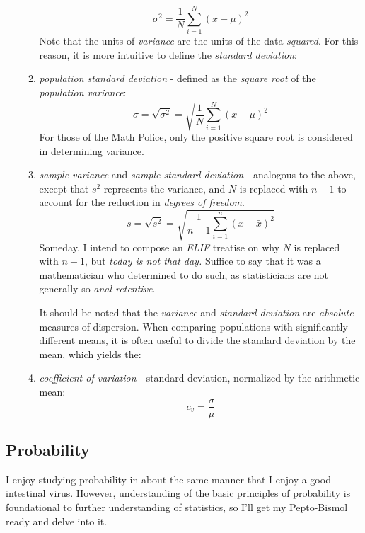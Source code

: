 \documentclass[12pt]{article}
\begin{document}
\begin{enumerate}
\begin{enumerate}
\begin{equation}
{\sigma}^2 = \frac{1}{N} \sum_{i=1}^{N} (x - \mu)^2
\end{equation}
Note that the units of \textit{variance} are the units of the data \textit{squared}. For this reason, it is more intuitive to define the \textit{standard deviation}:
\item \textit{population standard deviation} - defined as the \textit{square root} of the \textit{population variance}:
\begin{equation}
\sigma = \sqrt{{\sigma}^2} = \sqrt{\frac{1}{N} \sum_{i=1}^{N} (x - \mu)^2}
\end{equation}
For those of the Math Police, only the positive square root is considered in determining variance.
\item \textit{sample variance} and \textit{sample standard deviation} - analogous to the above, except that $s^2$ represents the variance, and $N$ is replaced with $n-1$ to account for the reduction in \textit{degrees of freedom}.
\begin{equation}
s = \sqrt{{s}^2} = \sqrt{\frac{1}{n-1} \sum_{i=1}^{n} (x - \bar{x})^2}
\end{equation}
Someday, I intend to compose an \textit{ELIF} treatise on why $N$ is replaced with $n-1$, but \textit{today is not that day.} Suffice to say that it was a mathematician who determined to do such, as statisticians are not generally so \textit{anal-retentive}.

It should be noted that the \textit{variance} and \textit{standard deviation} are \textit{absolute} measures of dispersion. When comparing populations with significantly different means, it is often useful to divide the standard deviation by the mean, which yields the:
\item \textit{coefficient of variation} - standard deviation, normalized by the arithmetic mean:
\begin{equation}
c_v = \frac{\sigma}{\mu}
\end{equation}

\end{enumerate}

\end{enumerate}

\subsection{Probability}
I enjoy studying probability in about the same manner that I enjoy a good intestinal virus. However, understanding of the basic principles of probability is foundational to further understanding of statistics, so I'll get my Pepto-Bismol ready and delve into it.
\end{document}
